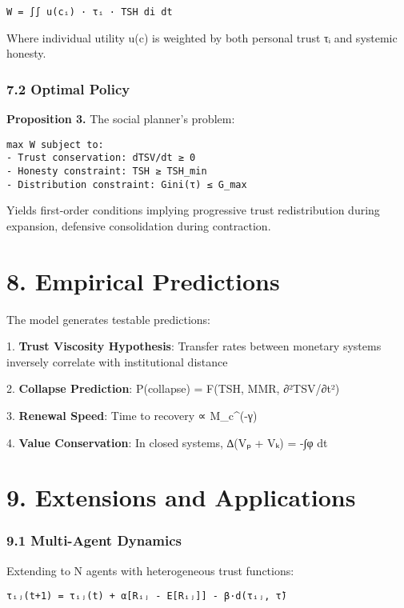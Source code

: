 \documentclass[11pt,oneside]{book}
\begin{document}
\begin{verbatim}
W = ∫∫ u(cᵢ) · τᵢ · TSH di dt
\end{verbatim}

Where individual utility u(c) is weighted by both personal trust τᵢ and systemic honesty.

\subsubsection{7.2 Optimal Policy}

\textbf{Proposition 3.} The social planner's problem:

\begin{verbatim}
max W subject to:
- Trust conservation: dTSV/dt ≥ 0
- Honesty constraint: TSH ≥ TSH_min  
- Distribution constraint: Gini(τ) ≤ G_max
\end{verbatim}

Yields first-order conditions implying progressive trust redistribution during expansion, defensive consolidation during contraction.

\section{8. Empirical Predictions}

The model generates testable predictions:


1. \textbf{Trust Viscosity Hypothesis}: Transfer rates between monetary systems inversely correlate with institutional distance


2. \textbf{Collapse Prediction}: P(collapse) = F(TSH, MMR, ∂²TSV/∂t²)


3. \textbf{Renewal Speed}: Time to recovery ∝ M_c^(-γ)


4. \textbf{Value Conservation}: In closed systems, ∆(Vₚ + Vₖ) = -∫φ dt


\section{9. Extensions and Applications}

\subsubsection{9.1 Multi-Agent Dynamics}

Extending to N agents with heterogeneous trust functions:

\begin{verbatim}
τᵢⱼ(t+1) = τᵢⱼ(t) + α[Rᵢⱼ - E[Rᵢⱼ]] - β·d(τᵢⱼ, τ̄)
\end{verbatim}
\end{document}
